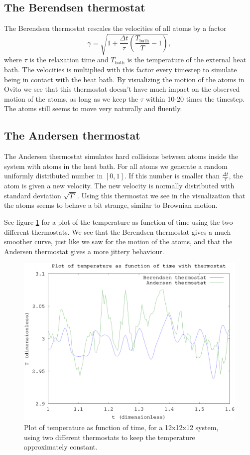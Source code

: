 \subsection*{The Berendsen thermostat}
The Berendsen thermostat rescales the velocities of all atoms by a factor
\[
    \gamma = \sqrt{1 + \frac{\Delta t}{\tau} \left(\frac{T_{\text{bath}}}{T} - 1\right)},
\]
where $\tau$ is the relaxation time and $T_\text{bath}$ is the temperature of the external heat bath. The velocities is multiplied with this factor every timestep to simulate being in contact with the heat bath. By visualizing the motion of the atoms in Ovito we see that this thermostat doesn't have much impact on the observed motion of the atoms, as long as we keep the $\tau$ within 10-20 times the timestep. The atoms still seems to move very naturally and fluently.

\subsection*{The Andersen thermostat}
The Andersen thermostat simulates hard collisions between atoms inside the system with atoms in the heat bath. For all atoms we generate a random uniformly distributed number in $[0,1]$. If this number is smaller than $\frac{\Delta t}{\tau}$, the atom is given a new velocity. The new velocity is normally distributed with standard deviation $\sqrt{T'}$. Using this thermostat we see in the visualization that the atoms seems to behave a bit strange, similar to Brownian motion.

See figure \ref{fig:q} for a plot of the temperature as function of time using the two different thermostats. We see that the Berendsen thermostat gives a much smoother curve, just like we saw for the motion of the atoms, and that the Andersen thermostat gives a more jittery behaviour.

\begin{figure}[h!]
    \centering
    \includegraphics[width =.70\textwidth]{bilder/q_plot01.eps}
    \parbox{4in} {
        \caption{
            \small{
                Plot of temperature as function of time, for a 12x12x12 system, using two different thermostats to keep the temperature approximately constant.
            }
            \label{fig:q}
        }
    }
\end{figure}


